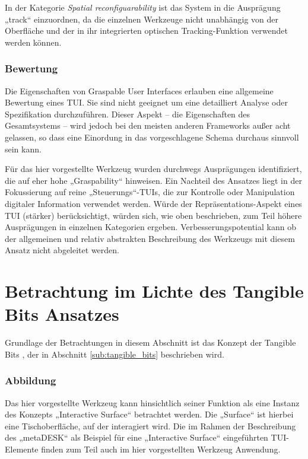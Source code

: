 In der Kategorie \emph{Spatial reconfiguarability} ist das System in die Ausprägung „track“ einzuordnen, da die einzelnen Werkzeuge nicht unabhängig von der Oberfläche und der in ihr integrierten optischen Tracking-Funktion verwendet werden können.

\subsubsection{Bewertung}

Die Eigenschaften von Graspable User Interfaces erlauben eine allgemeine Bewertung eines \gls{TUI}. Sie sind nicht geeignet um eine detailliert Analyse oder Spezifikation durchzuführen. Dieser Aspekt -- die Eigenschaften des Gesamtsystems -- wird jedoch bei den meisten anderen Frameworks außer acht gelassen, so dass eine Einordung in das vorgeschlagene Schema durchaus sinnvoll sein kann.

Für das hier vorgestellte Werkzeug wurden durchwegs Ausprägungen identifiziert, die auf eher hohe „Graspability“ hinweisen. Ein Nachteil des Ansatzes liegt in der Fokussierung auf reine „Steuerungs“-\glspl{TUI}, die zur Kontrolle oder Manipulation digitaler Information verwendet werden. Würde der Repräsentations-Aspekt eines \gls{TUI} (stärker) berücksichtigt, würden sich, wie oben beschrieben, zum Teil höhere Ausprägungen in einzelnen Kategorien ergeben. Verbesserungspotential kann ob der allgemeinen und relativ abstrakten Beschreibung des Werkzeugs mit diesem Ansatz nicht abgeleitet werden.


\section{Betrachtung im Lichte des Tangible Bits Ansatzes} %
\label{sec:betrachtung_tangible_bits}

Grundlage der Betrachtungen in diesem Abschnitt ist das Konzept der Tangible Bits \citep{Ishii97}, der in Abschnitt \ref{sub:tangible_bits} beschrieben wird.

\subsubsection{Abbildung} 

Das hier vorgestellte Werkzeug kann hinsichtlich seiner Funktion als eine Instanz des Konzepts „Interactive Surface“ betrachtet werden. Die „Surface“ ist hierbei eine Tischoberfläche, auf der interagiert wird. Die im Rahmen der Beschreibung des „metaDESK“ \citep{Ullmer97} als Beispiel für eine „Interactive Surface“ eingeführten \gls{TUI}-Elemente finden zum Teil auch im hier vorgestellten Werkzeug Anwendung.

